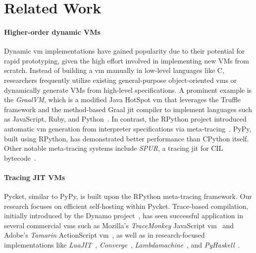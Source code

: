     \section{Related Work}
        \label{section:related-work}

        \paragraph{Higher-order dynamic VMs}%
            Dynamic \gls{vm} implementations have gained popularity due to their potential for rapid prototyping, given the high effort involved in implementing new VMs from scratch. Instead of building a \gls{vm} manually in low-level languages like C, researchers frequently utilize existing general-purpose object-oriented \glspl{vm} or dynamically generate VMs from high-level specifications. A prominent example is the \emph{GraalVM}, which is a modified Java HotSpot \gls{vm} that leverages the Truffle framework and the method-based Graal \gls{jit} compiler to implement languages such as JavaScript, Ruby, and Python~\cite{truffle-graal}. In contrast, the RPython project introduced automatic \gls{vm} generation from interpreter specifications via meta-tracing~\cite{rpython07}. PyPy, built using RPython, has demonstrated better performance than CPython itself. Other notable meta-tracing systems include \emph{SPUR}, a tracing \gls{jit} for CIL bytecode~\cite{spurJIT,millerCommonLanguageInfrastructure2003}.

        \paragraph{Tracing JIT VMs}%
            Pycket, similar to PyPy, is built upon the RPython meta-tracing framework. Our research focuses on efficient self-hosting within Pycket. Trace-based compilation, initially introduced by the Dynamo project~\cite{dynamo}, has seen successful application in several commercial \glspl{vm} such as Mozilla's \emph{TraceMonkey} JavaScript \gls{vm}~\cite{traceMonkey} and Adobe's \emph{Tamarin} ActionScript \gls{vm}~\cite{tamarin}, as well as in research-focused implementations like \emph{LuaJIT}~\cite{LuaJITLanguageToolkit}, \emph{Converge}~\cite{converge:05}, \emph{Lambdamachine}~\cite{lambdamachine}, and \emph{PyHaskell}~\cite{pyhaskell}.

